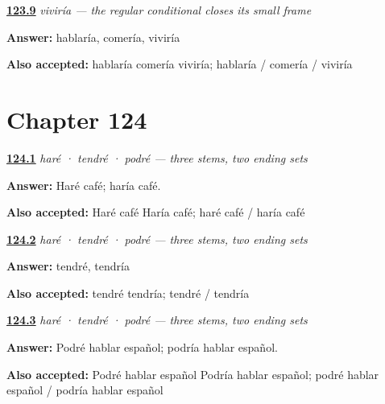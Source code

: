 \noindent\begin{minipage}[t]{\linewidth}
\raggedright
\hyperlink{review-ES-C17-vivir-condicional-three-yo}{\textbf{123.9}} \emph{viviría — the regular conditional closes its small frame}\par
\small \textbf{Answer:} hablaría, comería, viviría\par
\footnotesize \textbf{Also accepted:} hablaría comería viviría; hablaría / comería / viviría
\end{minipage}\par\medskip

\section*{Chapter 124}

\noindent\begin{minipage}[t]{\linewidth}
\raggedright
\hyperlink{review-ES-C17-irregulares-hacer-pair}{\textbf{124.1}} \emph{haré · tendré · podré — three stems, two ending sets}\par
\small \textbf{Answer:} Haré café; haría café.\par
\footnotesize \textbf{Also accepted:} Haré café Haría café; haré café / haría café
\end{minipage}\par\medskip

\noindent\begin{minipage}[t]{\linewidth}
\raggedright
\hyperlink{review-ES-C17-irregulares-tener-pair}{\textbf{124.2}} \emph{haré · tendré · podré — three stems, two ending sets}\par
\small \textbf{Answer:} tendré, tendría\par
\footnotesize \textbf{Also accepted:} tendré tendría; tendré / tendría
\end{minipage}\par\medskip

\noindent\begin{minipage}[t]{\linewidth}
\raggedright
\hyperlink{review-ES-C17-irregulares-poder-pair}{\textbf{124.3}} \emph{haré · tendré · podré — three stems, two ending sets}\par
\small \textbf{Answer:} Podré hablar español; podría hablar español.\par
\footnotesize \textbf{Also accepted:} Podré hablar español Podría hablar español; podré hablar español / podría hablar español
\end{minipage}\par\medskip

